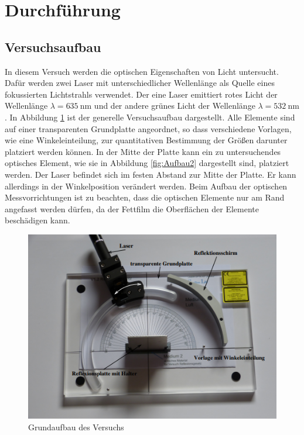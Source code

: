 \section{Durchführung}
\label{sec:Durchführung}
\subsection{Versuchsaufbau}
In diesem Versuch werden die optischen Eigenschaften von Licht untersucht. Dafür werden zwei 
Laser mit unterschiedlicher Wellenlänge als Quelle eines fokussierten Lichtstrahls verwendet.
Der eine Laser emittiert rotes Licht der Wellenlänge $\lambda=\qty{635}{\nano\meter}$ und der andere
grünes Licht der Wellenlänge $\lambda=\qty{532}{\nano\meter}$. In Abbildung \ref{fig:Aufbau1} ist der
generelle Versuchsaufbau dargestellt. Alle Elemente sind auf einer transparenten Grundplatte angeordnet, so
dass verschiedene Vorlagen, wie eine Winkeleinteilung, zur quantitativen Bestimmung der Größen darunter 
platziert werden können. In der Mitte der Platte kann ein zu untersuchendes optisches Element, wie
sie in Abbildung \ref{fig:Aufbau2} dargestellt sind, platziert werden. Der Laser befindet sich
im festen Abstand zur Mitte der Platte. Er kann allerdings in der Winkelposition verändert werden.
Beim Aufbau der optischen Messvorrichtungen ist zu beachten, dass die optischen Elemente nur am 
Rand angefasst werden dürfen, da der Fettfilm die Oberflächen der Elemente beschädigen kann.
\begin{figure}[H]
    \centering
    \includegraphics{content/Aufbau1.png}
    \caption{Grundaufbau des Versuchs\cite{V400}}
    \label{fig:Aufbau1}
\end{figure}
